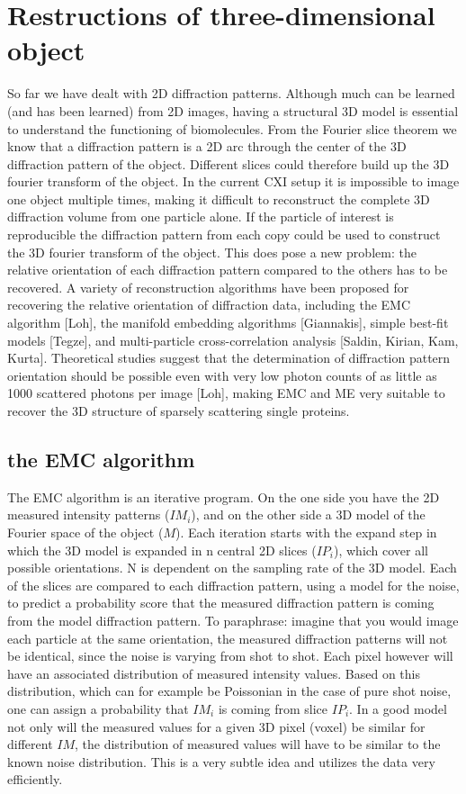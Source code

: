\chapter{Restructions of three-dimensional object}
So far we have dealt with 2D diffraction patterns. Although much can be learned (and has been learned) from 2D images, having a structural 3D model is essential to understand the functioning of biomolecules. From the Fourier slice theorem we know that a diffraction pattern is a 2D arc through the center of the 3D diffraction pattern of the object. Different slices could therefore build up the 3D fourier transform of the object. In the current CXI setup it is impossible to image one object multiple times, making it difficult to reconstruct the complete 3D diffraction volume from one particle alone. If the particle of interest is reproducible the diffraction pattern from each copy could be used to construct the 3D fourier transform of the object. This does pose a new problem: the relative orientation of each diffraction pattern compared to the others has to be recovered. A variety of reconstruction algorithms have been proposed for recovering the relative orientation of diffraction data, including the EMC algorithm [Loh], the manifold embedding algorithms [Giannakis], simple best-fit models [Tegze], and multi-particle cross-correlation analysis [Saldin, Kirian, Kam, Kurta]. Theoretical studies suggest that the determination of diffraction pattern orientation should be possible even with very low photon counts of as little as 1000 scattered photons per image [Loh], making EMC and ME very suitable to recover the 3D structure of sparsely scattering single proteins.

\section{the EMC algorithm}
The EMC algorithm is an iterative program. On the one side you have the 2D measured intensity patterns ($IM_i$), and on the other side a 3D model of the Fourier space of the object ($M$). Each iteration starts with the expand step in which the 3D model is expanded in n central 2D slices ($IP_i$), which cover all possible orientations. N is dependent on the sampling rate of the 3D model. Each of the slices are compared to each diffraction pattern, using a model for the noise, to predict a probability score that the measured diffraction pattern is coming from the model diffraction pattern. To paraphrase: imagine that you would image each particle at the same orientation, the measured diffraction patterns will not be identical, since the noise is varying from shot to shot. Each pixel however will have an associated distribution of measured intensity values. Based on this distribution, which can for example be Poissonian in the case of pure shot noise, one can assign a probability that $IM_i$ is coming from slice $IP_i$. In  a good model not only will the measured values for a given 3D pixel (voxel) be similar for different $IM$, the distribution of measured values will have to be similar to the known noise distribution. This is a very subtle idea and utilizes the data very efficiently.

